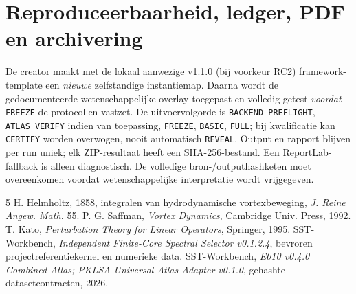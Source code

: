 \documentclass[11pt,a4paper]{article}
\begin{document}
\section{Reproduceerbaarheid, ledger, PDF en archivering}
De creator maakt met de lokaal aanwezige v1.1.0 (bij voorkeur RC2) framework-template een \emph{nieuwe} zelfstandige instantiemap. Daarna wordt de gedocumenteerde wetenschappelijke overlay toegepast en volledig getest \emph{voordat} \texttt{FREEZE} de protocollen vastzet. De uitvoervolgorde is \texttt{BACKEND\_PREFLIGHT}, \texttt{ATLAS\_VERIFY} indien van toepassing, \texttt{FREEZE}, \texttt{BASIC}, \texttt{FULL}; bij kwalificatie kan \texttt{CERTIFY} worden overwogen, nooit automatisch \texttt{REVEAL}. Output en rapport blijven per run uniek; elk ZIP-resultaat heeft een SHA-256-bestand. Een ReportLab-fallback is alleen diagnostisch. De volledige bron-/outputhashketen moet overeenkomen voordat wetenschappelijke interpretatie wordt vrijgegeven.
\begin{thebibliography}{5}
 H. Helmholtz, 1858, integralen van hydrodynamische vortexbeweging, \emph{J. Reine Angew. Math.} 55.
 P. G. Saffman, \emph{Vortex Dynamics}, Cambridge Univ. Press, 1992.
 T. Kato, \emph{Perturbation Theory for Linear Operators}, Springer, 1995.
 SST-Workbench, \emph{Independent Finite-Core Spectral Selector v0.1.2.4}, bevroren projectreferentiekernel en numerieke data.
 SST-Workbench, \emph{E010 v0.4.0 Combined Atlas; PKLSA Universal Atlas Adapter v0.1.0}, gehashte datasetcontracten, 2026.
\end{thebibliography}
\end{document}
